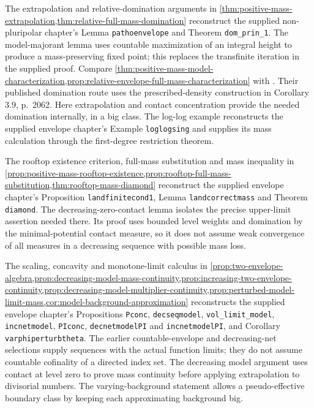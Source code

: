 The extrapolation and relative-domination arguments in \cref{thm:positive-mass-extrapolation,thm:relative-full-mass-domination} reconstruct the supplied non-pluripolar chapter's Lemma \texttt{pathoenvelope} and Theorem \texttt{dom\_prin\_1}. The model-majorant lemma uses countable maximization of an integral height to produce a mass-preserving fixed point; this replaces the transfinite iteration in the supplied proof. Compare \cref{thm:positive-mass-model-characterization,prop:relative-envelope-full-mass-characterization} with \cite[Theorems 3.12 and 3.14, pp.~2063--2064]{DDNL18mono}. Their published domination route uses the prescribed-density construction in Corollary 3.9, p.~2062. Here extrapolation and contact concentration provide the needed domination internally, in a big class. The log-log example reconstructs the supplied envelope chapter's Example \texttt{loglogsing} and supplies its mass calculation through the first-degree restriction theorem.

The rooftop existence criterion, full-mass substitution and mass inequality in \cref{prop:positive-mass-rooftop-existence,prop:rooftop-full-mass-substitution,thm:rooftop-mass-diamond} reconstruct the supplied envelope chapter's Proposition \texttt{landfinitecond1}, Lemma \texttt{landcorrectmass} and Theorem \texttt{diamond}. The decreasing-zero-contact lemma isolates the precise upper-limit assertion needed there. Its proof uses bounded level weights and domination by the minimal-potential contact measure, so it does not assume weak convergence of all measures in a decreasing sequence with possible mass loss.

The scaling, concavity and monotone-limit calculus in \cref{prop:two-envelope-algebra,prop:decreasing-model-mass-continuity,prop:increasing-two-envelope-continuity,prop:decreasing-model-multiplier-continuity,prop:perturbed-model-limit-mass,cor:model-background-approximation} reconstructs the supplied envelope chapter's Propositions \texttt{Pconc}, \texttt{decseqmodel}, \texttt{vol\_limit\_model}, \texttt{incnetmodel}, \texttt{PIconc}, \texttt{decnetmodelPI} and \texttt{incnetmodelPI}, and Corollary \texttt{varphiperturbtheta}. The earlier countable-envelope and decreasing-net selections supply sequences with the actual function limits; they do not assume countable cofinality of a directed index set. The decreasing model argument uses contact at level zero to prove mass continuity before applying extrapolation to divisorial numbers. The varying-background statement allows a pseudo-effective boundary class by keeping each approximating background big.

